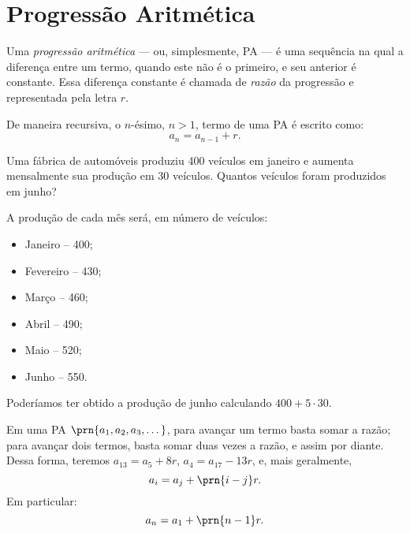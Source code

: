 \section{Progressão Aritmética}

\begin{definition}
Uma \emph{progressão aritmética} --- ou, simplesmente, PA --- é uma sequência na qual a diferença entre um termo, quando este não é o primeiro, e seu anterior  é constante. Essa diferença constante é chamada de \emph{razão} da progressão e representada pela
letra $r$.
\end{definition}

\begin{remark}
De maneira recursiva, o $n$-ésimo, $n>1$, termo de uma PA é escrito
como:
%
\begin{equation*}
a_n = a_{n-1} + r.
\end{equation*}
\end{remark}

\begin{example}
Uma fábrica de automóveis produziu 400 veículos em janeiro e aumenta mensalmente sua produção em 30 veículos. Quantos veículos foram produzidos em junho?
\end{example}

\begin{solution}
A produção de cada mês será, em número de veículos:
%
\begin{itemize}
	\item Janeiro -- 400;
	\item Fevereiro -- 430;
	\item Março -- 460;
	\item Abril -- 490;
	\item Maio -- 520;
	\item Junho -- 550.
\end{itemize}
%
Poderíamos ter obtido a produção de junho calculando $400 + 5 \cdot 30$.
\end{solution}

\begin{remark}
Em uma PA $\prn{ a_1 , a_2 , a_3 , \dots }$, para avançar um termo basta somar a razão; para avançar dois termos, basta somar duas
vezes a razão, e assim por diante. Dessa forma, teremos $a_{13} = a_5 +8r$, $a_4 = a_{17} - 13r$, e, mais geralmente, 
%
\begin{equation*}
a_i = a_j + \prn{i-j}r.
\end{equation*}
%
Em particular:
%
\begin{equation*}
a_n = a_1 + \prn{n-1}r.
\end{equation*}
\end{remark}

